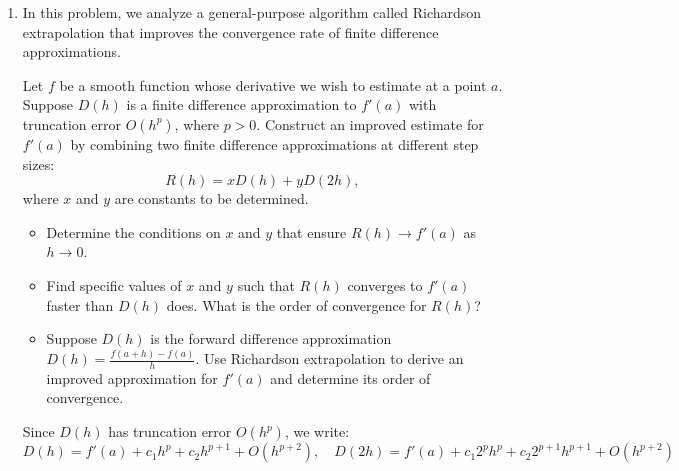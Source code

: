 \documentclass[reqno, answers]{exam}
\begin{document}
\begin{enumerate}
\begin{solution}
Computing the numerator:
\begin{align*}
&f(-h) - 2f(0) + f(h)\\
&= \left[f(0) - hf'(0) + \frac{h^2}{2}f''(0) - \frac{h^3}{6}f'''(0) + \frac{h^4}{24}f^{(4)}(0)\right]\\
&\quad - 2f(0) + \left[f(0) + hf'(0) + \frac{h^2}{2}f''(0) + \frac{h^3}{6}f'''(0) + \frac{h^4}{24}f^{(4)}(0)\right] + O(h^5)\\
&= h^2f''(0) + \frac{h^4}{12}f^{(4)}(0) + O(h^5)
\end{align*}

Dividing by $h^2$:
$$\frac{f(-h) - 2f(0) + f(h)}{h^2} = f''(0) + \frac{h^2}{12}f^{(4)}(0) + O(h^3)$$

Therefore:
$$\tau_f(h) = -\frac{h^2}{12}f^{(4)}(0) + O(h^3)$$

Since the leading term of the truncation error is $O(h^2)$, the formula is \textbf{second-order accurate}.

$$\boxed{\tau_f(h) = O(h^2)}$$
\end{solution}

\item In this problem, we analyze a general-purpose algorithm called Richardson extrapolation that improves the convergence rate of finite difference approximations. 

Let $f$ be a smooth function whose derivative we wish to estimate at a point $a$. Suppose $D(h)$ is a finite difference approximation to $f'(a)$ with truncation error $O(h^p)$, where $p > 0$. 
Construct an improved estimate for $f'(a)$ by combining two finite difference approximations at different step sizes:
\[
R(h) = x D(h) + y D(2h),
\]
where $x$ and $y$ are constants to be determined.

\begin{itemize}
    \item Determine the conditions on $x$ and $y$ that ensure $R(h) \to f'(a)$ as $h \to 0$.
    \item Find specific values of $x$ and $y$ such that $R(h)$ converges to $f'(a)$ faster than $D(h)$ does. What is the order of convergence for $R(h)$?
    \item Suppose $D(h)$ is the forward difference approximation $D(h) = \frac{f(a+h) - f(a)}{h}$. Use Richardson extrapolation to derive an improved approximation for $f'(a)$ and determine its order of convergence.
\end{itemize}

\begin{solution}
    Since $D(h)$ has truncation error $O(h^p)$, we write:
\[
D(h) = f'(a) + c_1 h^p + c_2 h^{p+1} + O(h^{p+2}), \quad D(2h) = f'(a) + c_1 2^p h^p + c_2 2^{p+1} h^{p+1} + O(h^{p+2})
\]


\end{solution}
\end{enumerate}
\end{document}
